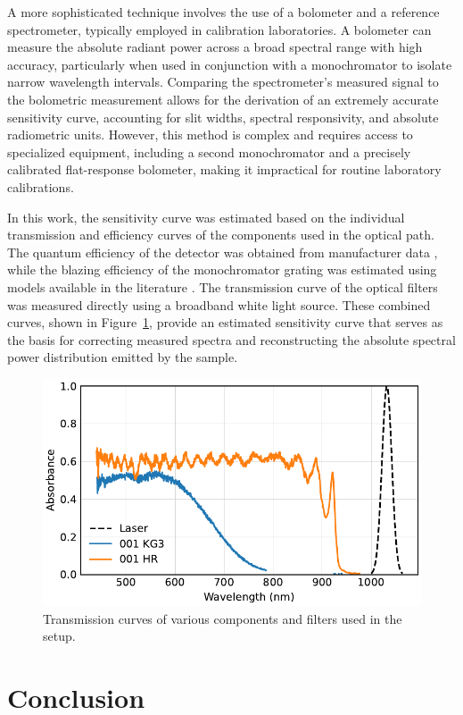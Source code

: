 \documentclass[
	parskip=half,
	a4paper,
]{scrarticle}
\begin{document}
A more sophisticated technique involves the use of a bolometer and a reference spectrometer, typically employed in calibration laboratories. A bolometer can measure the absolute radiant power across a broad spectral range with high accuracy, particularly when used in conjunction with a monochromator to isolate narrow wavelength intervals. Comparing the spectrometer's measured signal to the bolometric measurement allows for the derivation of an extremely accurate sensitivity curve, accounting for slit widths, spectral responsivity, and absolute radiometric units. However, this method is complex and requires access to specialized equipment, including a second monochromator and a precisely calibrated flat-response bolometer, making it impractical for routine laboratory calibrations.

In this work, the sensitivity curve was estimated based on the individual transmission and efficiency curves of the components used in the optical path. The quantum efficiency of the detector was obtained from manufacturer data \cite{andor_ixonem_nodate}, while the blazing efficiency of the monochromator grating was estimated using models available in the literature \cite{barker_ripple_1984}. The transmission curve of the optical filters was measured directly using a broadband white light source. These combined curves, shown in Figure~\ref{fig:transmission}, provide an estimated sensitivity curve that serves as the basis for correcting measured spectra and reconstructing the absolute spectral power distribution emitted by the sample.

\begin{figure}
    \centering
    \includegraphics{../analysis/figures/filter.pdf}
    \caption{Transmission curves of various components and filters used in the setup.}
    \label{fig:transmission}
\end{figure}

 


\section*{Conclusion}

\clearpage
\printbibliography
\end{document}
